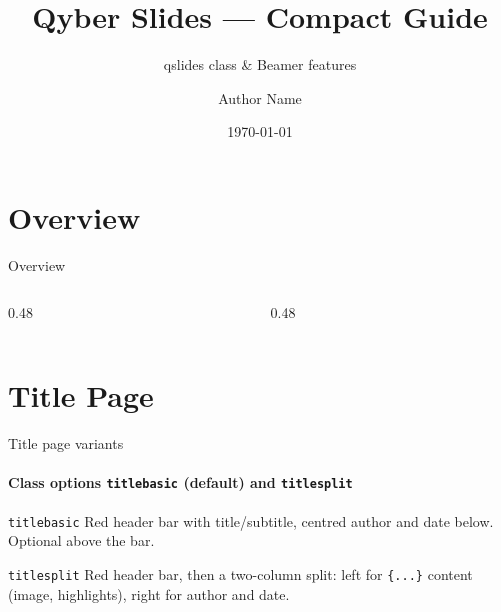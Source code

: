 \documentclass[sans,numeric,titlesplit]{qslides}
\title{Qyber Slides --- Compact Guide}
\subtitle{qslides class \& Beamer features}
\author{Author Name}
\date{\today}
\begin{document}

\begin{frame}
  \titlepage
\end{frame}

\section{Overview}

\begin{frame}{Overview}
  \begin{columns}[onlytextwidth,T]
    \begin{column}{0.48\linewidth}
      \tableofcontents[sections={1-9}]
    \end{column}
    \begin{column}{0.48\linewidth}
      \tableofcontents[sections={10-17}]
    \end{column}
  \end{columns}
\end{frame}


\section{Title Page}

\begin{frame}{Title page variants}
  \framesubtitle{Class options \texttt{titlebasic} (default) and \texttt{titlesplit}}
  \begin{twocolumns}[t]
    \begin{leftcolumn}
      \begin{block}{\texttt{titlebasic}}
        Red header bar with title/subtitle, centred author and date below.
        Optional \texttt{\string\titlegraphic} above the bar.
      \end{block}
    \end{leftcolumn}
    \begin{rightcolumn}
      \begin{block}{\texttt{titlesplit}}
        Red header bar, then a two-column split: left for
        \texttt{\string\titlebox\{...\}} content (image, highlights),
        right for author and date.
      \end{block}
    \end{rightcolumn}
  \end{twocolumns}
  \vspace{1ex}
\end{frame}
\end{document}

